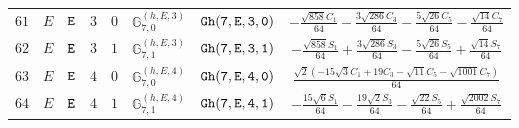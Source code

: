 \documentclass[fleqn,8pt]{jsarticle}
\begin{document}
\begin{table}[ht!]
\begin{center}
\begin{tabular}{cccccccc}
$ 61 $ & $ E $ & $ {\tt E} $ & $ 3 $ & $ 0 $ & $ \mathbb{G}_{7,0}^{(h,E,3)} $ & $ {\tt Gh(7,E,3,0)} $ & $ - \frac{\sqrt{858} C_{1}}{64} - \frac{3 \sqrt{286} C_{3}}{64} - \frac{5 \sqrt{26} C_{5}}{64} - \frac{\sqrt{14} C_{7}}{64} $ \\
$ 62 $ & $ E $ & $ {\tt E} $ & $ 3 $ & $ 1 $ & $ \mathbb{G}_{7,1}^{(h,E,3)} $ & $ {\tt Gh(7,E,3,1)} $ & $ - \frac{\sqrt{858} S_{1}}{64} + \frac{3 \sqrt{286} S_{3}}{64} - \frac{5 \sqrt{26} S_{5}}{64} + \frac{\sqrt{14} S_{7}}{64} $ \\
$ 63 $ & $ E $ & $ {\tt E} $ & $ 4 $ & $ 0 $ & $ \mathbb{G}_{7,0}^{(h,E,4)} $ & $ {\tt Gh(7,E,4,0)} $ & $ \frac{\sqrt{2} \left(- 15 \sqrt{3} C_{1} + 19 C_{3} - \sqrt{11} C_{5} - \sqrt{1001} C_{7}\right)}{64} $ \\
$ 64 $ & $ E $ & $ {\tt E} $ & $ 4 $ & $ 1 $ & $ \mathbb{G}_{7,1}^{(h,E,4)} $ & $ {\tt Gh(7,E,4,1)} $ & $ - \frac{15 \sqrt{6} S_{1}}{64} - \frac{19 \sqrt{2} S_{3}}{64} - \frac{\sqrt{22} S_{5}}{64} + \frac{\sqrt{2002} S_{7}}{64} $ \\
 \hline \hline
\end{tabular}
\end{center}
\end{table}
\end{document}
